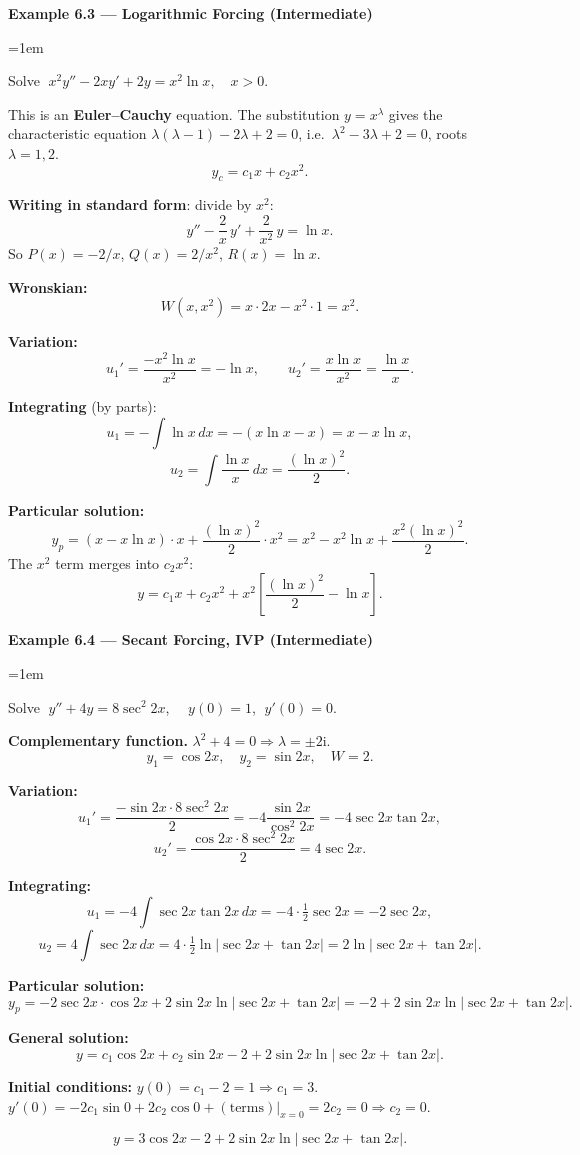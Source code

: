 \documentclass[12pt,a4paper]{article}
\newenvironment{example}[1]{%
  \vspace{0.8em}
  \noindent{\footnotesize\scshape\color{orange!50!black} Example}\par
  \noindent\textbf{#1}\par\vspace{0.3em}
  \begin{list}{}{\leftmargin=1em\rightmargin=0pt}\item
}{%
  \end{list}\vspace{0.8em}
}
\newcommand{\ii}{\mathrm{i}}
\begin{document}
\begin{example}{Example 6.3 --- Logarithmic Forcing (Intermediate)}
Solve $\;x^2 y'' - 2xy' + 2y = x^2\ln x, \quad x > 0$.

\medskip
This is an \textbf{Euler--Cauchy} equation. The substitution $y=x^\lambda$ gives
the characteristic equation $\lambda(\lambda-1)-2\lambda+2=0$, i.e.\ $\lambda^2-3\lambda+2=0$,
roots $\lambda=1,2$.
\[
  y_c = c_1 x + c_2 x^2.
\]

\textbf{Writing in standard form}: divide by $x^2$:
\[
  y'' - \frac{2}{x}\,y' + \frac{2}{x^2}\,y = \ln x.
\]
So $P(x) = -2/x$, $Q(x)=2/x^2$, $R(x)=\ln x$.

\textbf{Wronskian:}
\[
  W(x,x^2) = x\cdot 2x - x^2\cdot 1 = x^2.
\]

\textbf{Variation:}
\[
  u_1' = \frac{-x^2\ln x}{x^2} = -\ln x, \qquad
  u_2' = \frac{x\ln x}{x^2} = \frac{\ln x}{x}.
\]

\textbf{Integrating} (by parts):
\[
  u_1 = -\int \ln x\,dx = -(x\ln x - x) = x - x\ln x,
\]
\[
  u_2 = \int\frac{\ln x}{x}\,dx = \frac{(\ln x)^2}{2}.
\]

\textbf{Particular solution:}
\[
  y_p = (x - x\ln x)\cdot x + \frac{(\ln x)^2}{2}\cdot x^2
      = x^2 - x^2\ln x + \frac{x^2(\ln x)^2}{2}.
\]
The $x^2$ term merges into $c_2 x^2$:
\[
  \boxed{y = c_1 x + c_2 x^2 + x^2\!\left[\frac{(\ln x)^2}{2} - \ln x\right].}
\]
\end{example}


\begin{example}{Example 6.4 --- Secant Forcing, IVP (Intermediate)}
Solve $\;y'' + 4y = 8\sec^2 2x$, $\quad y(0) = 1$, $\;y'(0) = 0$.

\medskip
\textbf{Complementary function.} $\lambda^2+4=0 \Rightarrow \lambda=\pm 2\ii$.
\[
  y_1 = \cos 2x,\quad y_2=\sin 2x,\quad W=2.
\]

\textbf{Variation:}
\[
  u_1' = \frac{-\sin 2x\cdot 8\sec^2 2x}{2} = -4\frac{\sin 2x}{\cos^2 2x}
       = -4\sec 2x\tan 2x,
\]
\[
  u_2' = \frac{\cos 2x\cdot 8\sec^2 2x}{2} = 4\sec 2x.
\]

\textbf{Integrating:}
\[
  u_1 = -4\int\sec 2x\tan 2x\,dx = -4\cdot\tfrac{1}{2}\sec 2x = -2\sec 2x,
\]
\[
  u_2 = 4\int\sec 2x\,dx = 4\cdot\tfrac{1}{2}\ln|\sec 2x + \tan 2x|
       = 2\ln|\sec 2x + \tan 2x|.
\]

\textbf{Particular solution:}
\[
  y_p = -2\sec 2x\cdot\cos 2x + 2\sin 2x\ln|\sec 2x+\tan 2x|
      = -2 + 2\sin 2x\ln|\sec 2x+\tan 2x|.
\]

\textbf{General solution:}
\[
  y = c_1\cos 2x + c_2\sin 2x - 2 + 2\sin 2x\ln|\sec 2x+\tan 2x|.
\]

\textbf{Initial conditions:} $y(0) = c_1 - 2 = 1 \Rightarrow c_1 = 3$.
$y'(0) = -2c_1\sin 0 + 2c_2\cos 0 + (\text{terms})|_{x=0} = 2c_2 = 0 \Rightarrow c_2=0$.

\[
  \boxed{y = 3\cos 2x - 2 + 2\sin 2x\ln|\sec 2x+\tan 2x|.}
\]
\end{example}
\end{document}
